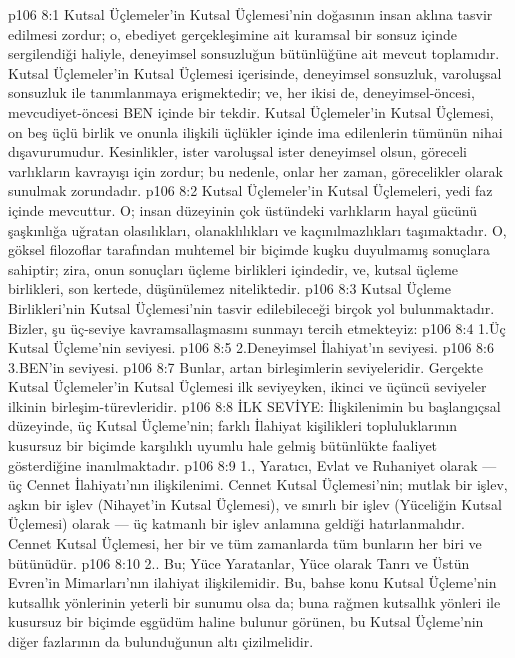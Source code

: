 \vs p106 8:1 Kutsal Üçlemeler’in Kutsal Üçlemesi’nin doğasının insan aklına tasvir edilmesi zordur; o, ebediyet gerçekleşimine ait kuramsal bir sonsuz içinde sergilendiği haliyle, deneyimsel sonsuzluğun bütünlüğüne ait mevcut toplamıdır. Kutsal Üçlemeler’in Kutsal Üçlemesi içerisinde, deneyimsel sonsuzluk, varoluşsal sonsuzluk ile tanımlanmaya erişmektedir; ve, her ikisi de, deneyimsel\hyp{}öncesi, mevcudiyet\hyp{}öncesi BEN içinde bir tekdir. Kutsal Üçlemeler’in Kutsal Üçlemesi, on beş üçlü birlik ve onunla ilişkili üçlükler içinde ima edilenlerin tümünün nihai dışavurumudur. Kesinlikler, ister varoluşsal ister deneyimsel olsun, göreceli varlıkların kavrayışı için zordur; bu nedenle, onlar her zaman, görecelikler olarak sunulmak zorundadır.
\vs p106 8:2 Kutsal Üçlemeler’in Kutsal Üçlemeleri, yedi faz içinde mevcuttur. O; insan düzeyinin çok üstündeki varlıkların hayal gücünü şaşkınlığa uğratan olasılıkları, olanaklılıkları ve kaçınılmazlıkları taşımaktadır. O, göksel filozoflar tarafından muhtemel bir biçimde kuşku duyulmamış sonuçlara sahiptir; zira, onun sonuçları üçleme birlikleri içindedir, ve, kutsal üçleme birlikleri, son kertede, düşünülemez niteliktedir.
\vs p106 8:3 Kutsal Üçleme Birlikleri’nin Kutsal Üçlemesi’nin tasvir edilebileceği birçok yol bulunmaktadır. Bizler, şu üç\hyp{}seviye kavramsallaşmasını sunmayı tercih etmekteyiz:
\vs p106 8:4 1.\bibnobreakspace Üç Kutsal Üçleme’nin seviyesi.
\vs p106 8:5 2.\bibnobreakspace Deneyimsel İlahiyat’ın seviyesi.
\vs p106 8:6 3.\bibnobreakspace BEN’in seviyesi.
\vs p106 8:7 Bunlar, artan birleşimlerin seviyeleridir. Gerçekte Kutsal Üçlemeler’in Kutsal Üçlemesi ilk seviyeyken, ikinci ve üçüncü seviyeler ilkinin birleşim\hyp{}türevleridir.
\vs p106 8:8 İLK SEVİYE: İlişkilenimin bu başlangıçsal düzeyinde, üç Kutsal Üçleme’nin; farklı İlahiyat kişilikleri topluluklarının kusursuz bir biçimde karşılıklı uyumlu hale gelmiş bütünlükte faaliyet gösterdiğine inanılmaktadır.
\vs p106 8:9 1.\bibnobreakspace {}, Yaratıcı, Evlat ve Ruhaniyet olarak --- üç Cennet İlahiyatı’nın ilişkilenimi. Cennet Kutsal Üçlemesi’nin; mutlak bir işlev, aşkın bir işlev (Nihayet’in Kutsal Üçlemesi), ve sınırlı bir işlev (Yüceliğin Kutsal Üçlemesi) olarak --- üç katmanlı bir işlev anlamına geldiği hatırlanmalıdır. Cennet Kutsal Üçlemesi, her bir ve tüm zamanlarda tüm bunların her biri ve bütünüdür.
\vs p106 8:10 2.\bibnobreakspace {}. Bu; Yüce Yaratanlar, Yüce olarak Tanrı ve Üstün Evren’in Mimarları’nın ilahiyat ilişkilemidir. Bu, bahse konu Kutsal Üçleme’nin kutsallık yönlerinin yeterli bir sunumu olsa da; buna rağmen kutsallık yönleri ile kusursuz bir biçimde eşgüdüm haline bulunur görünen, bu Kutsal Üçleme’nin diğer fazlarının da bulunduğunun altı çizilmelidir.
